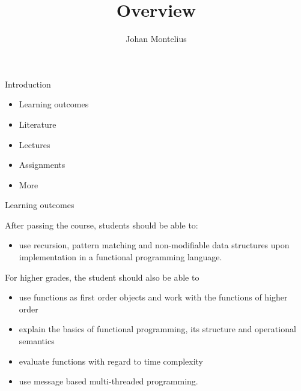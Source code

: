 

\title[ID1019 Overview]{Overview}


\author{Johan Montelius}
\date{\semester}



\begin{frame}
\titlepage
\end{frame}


\begin{frame}{Introduction}
  \begin{itemize}
    \pause \item Learning outcomes
    \pause \item Literature
    \pause \item Lectures
    \pause \item Assignments
    \pause \item More
  \end{itemize}
\end{frame}


\begin{frame}{Learning outcomes}

After passing the course, students should be able to:

\begin{itemize}
\item use recursion, pattern matching and  non-modifiable data structures upon implementation in a functional programming language.
\end{itemize}

\pause

For higher grades, the student should also be able to

\begin{itemize}
\item use functions as first order objects and work with the functions of higher order
\item explain the basics of functional programming, its structure and operational semantics
\item evaluate functions with regard to time complexity
\item use message based multi-threaded programming.   
\end{itemize}

\end{frame}


